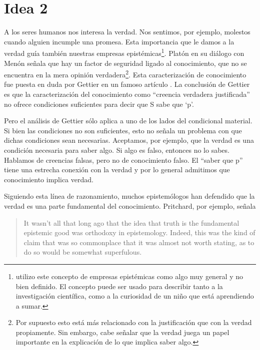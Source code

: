 \documentclass[12pt]{article}
\begin{document}
\section{Idea 2}

\noindent A los seres humanos nos interesa la verdad. Nos sentimos, por ejemplo, molestos cuando alguien incumple una promesa. Esta importancia que le damos a la verdad guía también nuestras empresas epistémicas\footnote{utilizo este concepto de empresas epistémicas como algo muy general y no bien definido. El concepto puede ser usado para describir tanto a la investigación científica, como a la curiosidad de un niño que está aprendiendo a sumar.}. Platón en su diálogo con Menón \cite[\P\P 97a-98b]{platonmeno} señala que hay un factor de seguridad ligado al conocimiento, que no se encuentra en la mera opinión verdadera\footnote{Por supuesto esto está más relacionado con la justificación que con la verdad propiamente. Sin embargo, cabe señalar que la verdad juega un papel importante en la explicación de lo que implica saber algo.}. Esta caracterización de conocimiento fue puesta en duda por Gettier en un famoso artículo \citeyear{Gettier}. La conclusión de Gettier es que la caracterización del conocimiento como ``creencia verdadera justificada'' no ofrece condiciones suficientes para decir que S sabe que `p'.

Pero el análisis de Gettier sólo aplica a uno de los lados del condicional material. Si bien las condiciones no son suficientes, esto no señala un problema con que dichas condiciones sean necesarias. Aceptamos, por ejemplo, que la verdad es una condición necesaria para saber algo. Si algo es falso, entonces no lo sabes. Hablamos de creencias falsas, pero no de conocimiento falso. El ``saber que p'' tiene una estrecha conexión con la verdad y por lo general admitimos que conocimiento implica verdad.

Siguiendo esta línea de razonamiento, muchos epistemólogos han defendido que la verdad es una parte fundamental del conocimiento. Pritchard, por ejemplo, señala  

\begin{quote}
It wasn’t all that long ago that the idea that truth is the fundamental epistemic good was orthodoxy in epistemology. Indeed, this was the kind of claim that was so commonplace that it was almost not worth stating, as to do so would be somewhat superfulous. \cite[p. 1]{Pritchard2021}
\end{quote}
\end{document}
